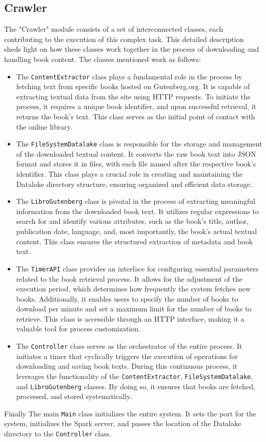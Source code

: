 \documentclass{article}
\begin{document}
\subsection{Crawler}

The "Crawler" module consists of a set of interconnected classes, each contributing to the execution of this complex task. This detailed description sheds light on how these classes work together in the process of downloading and handling book content.
The classes mentioned work as follows:
\begin{itemize}
\item
The \texttt{ContentExtractor} class plays a fundamental role in the process by fetching text from specific books hosted on Gutenberg.org. It is capable of extracting textual data from the site using HTTP requests. To initiate the process, it requires a unique book identifier, and upon successful retrieval, it returns the book's text. This class serves as the initial point of contact with the online library.
\item
The \texttt{FileSystemDatalake} class is responsible for the storage and management of the downloaded textual content. It converts the raw book text into JSON format and stores it in files, with each file named after the respective book's identifier. This class plays a crucial role in creating and maintaining the Datalake directory structure, ensuring organized and efficient data storage.
\item
The \texttt{LibroGutenberg} class is pivotal in the process of extracting meaningful information from the downloaded book text. It utilizes regular expressions to search for and identify various attributes, such as the book's title, author, publication date, language, and, most importantly, the book's actual textual content. This class ensures the structured extraction of metadata and book text.
\item
The \texttt{TimerAPI} class provides an interface for configuring essential parameters related to the book retrieval process. It allows for the adjustment of the execution period, which determines how frequently the system fetches new books. Additionally, it enables users to specify the number of books to download per minute and set a maximum limit for the number of books to retrieve. This class is accessible through an HTTP interface, making it a valuable tool for process customization.
\item
The \texttt{Controller} class serves as the orchestrator of the entire process. It initiates a timer that cyclically triggers the execution of operations for downloading and saving book texts. During this continuous process, it leverages the functionality of the \texttt{ContentExtractor}, \texttt{FileSystemDatalake}, and \texttt{LibroGutenberg} classes. By doing so, it ensures that books are fetched, processed, and stored systematically.
\end{itemize}
Finally The main \texttt{Main} class initializes the entire system. It sets the port for the system, initializes the Spark server, and passes the location of the Datalake directory to the \texttt{Controller} class.
\end{document}

